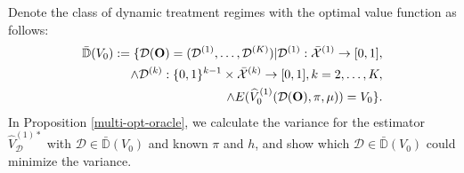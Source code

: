 \documentclass[11pt]{article}
\theoremstyle{referenceplain}
\theoremstyle{referencedefinition}
\theoremstyle{referenceremark}
\begin{document}
Denote the class of dynamic treatment regimes with the optimal value function as follows:
 \begin{align*}
     \Bar{\mathbb{D}}(V_0):=\{\mathcal{D}(\mathbf{O})=(\mathcal{D}^{(1)},\dots,\mathcal{D}^{(K)})|\mathcal{D}^{(1)}:\Bar{\mathcal{X}}^{(1)}\to[0,1], \\\land\mathcal{D}^{(k)}:\{0,1\}^{k-1} \times \Bar{\mathcal{X}}^{(k)}\to[0,1], k=2,\dots,K,\\
     \land E(\widehat{V}_0^{(1)}(\mathcal{D}(\mathbf{O}),\pi,\mu))=V_0 \}.
 \end{align*}
In Proposition \ref{multi-opt-oracle}, we calculate the variance for the estimator $\widehat{V}_{\mathcal{D}}^{(1)*}$ with $\mathcal{D}\in\bar{\mathbb{D}}(V_0)$ and known $\pi$ and $h$, and show which  $\mathcal{D}\in\bar{\mathbb{D}}(V_0)$ could minimize the variance.
\end{document}
